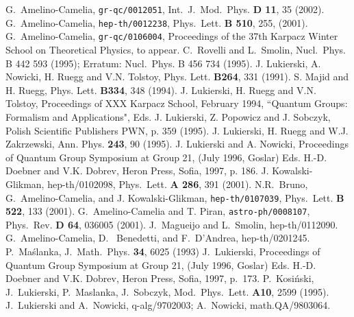\documentclass[a4paper,a4paper]{article}
\begin{document}
\begin{thebibliography}{99}
 G.~Amelino-Camelia, {\tt gr-qc/0012051}, Int.~J.~Mod.~Phys. {\bf D 11}, 35 (2002).
 G.~Amelino-Camelia, {\tt hep-th/0012238}, Phys.~Lett. {\bf B 510}, 255, (2001).
 G.~Amelino-Camelia, {\tt gr-qc/0106004}, Proceedings of the 37th Karpacz Winter School on Theoretical Physics, to appear.
 C.~Rovelli and L.~Smolin, Nucl.~Phys. {B 442} 593 (1995); Erratum: Nucl.~Phys. {B 456} 734 (1995).
 J. Lukierski, A. Nowicki, H. Ruegg and V.N. Tolstoy,
Phys. Lett.  {\bf B264}, 331 (1991).
 S. Majid and H. Ruegg, Phys. Lett. {\bf B334},
348 (1994).
 J. Lukierski, H. Ruegg and V.N. Tolstoy,
Proceedings of XXX Karpacz School, February 1994, ``Quantum
Groups: Formalism and Applications", Eds. J. Lukierski,
 Z. Popowicz and J. Sobczyk, Polish Scientific Publishers PWN,
p. 359 (1995).
 J. Lukierski, H. Ruegg and W.J. Zakrzewski, Ann.
Phys. {\bf 243}, 90 (1995).
 J. Lukierski and A. Nowicki, Proceedings of
Quantum Group Symposium at Group 21, (July 1996, Goslar) Eds.
H.-D. Doebner and V.K. Dobrev, Heron Press, Sofia, 1997, p. 186.
 J. Kowalski-Glikman, hep-th/0102098, Phys.~Lett. {\bf A 286}, 391 (2001).
 N.R.~Bruno, G.~Amelino-Camelia, and J. Kowalski-Glikman, {\tt hep-th/0107039}, Phys.~Lett. {\bf B 522}, 133 (2001).
 G.~Amelino-Camelia and T. Piran, {\tt astro-ph/0008107}, Phys.~Rev. {\bf D 64}, 036005 (2001).
 J.~Magueijo and L.~Smolin, hep-th/0112090.
 G.~Amelino-Camelia, D. ~Benedetti, and F.~D'Andrea, hep-th/0201245.
 P.~Ma\'slanka, J.~Math.~Phys. {\bf 34}, 6025 (1993)
 J.~Lukierski, Proceedings of
Quantum Group Symposium at Group 21, (July 1996, Goslar) Eds.
H.-D. Doebner and V.K. Dobrev, Heron Press, Sofia, 1997, p.~173.
 P.~Kosi\'nski, J.~Lukierski, P.~Maslanka, J.~Sobczyk, Mod.~Phys.~Lett. {\bf A10}, 2599 (1995).
 J.~Lukierski and A.~Nowicki, q-alg/9702003; A.~Nowicki, math.QA/9803064.
\end{thebibliography}
\end{document}
